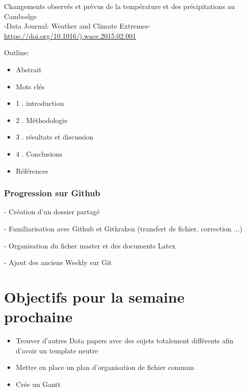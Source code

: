 \documentclass[11pt,oneside]{article}
\begin{document}
\begin{center}
Changements observés et prévus de la température et des précipitations au Cambodge\\
-Data Journal: Weather and Climate Extremes-\\
\url {https://doi.org/10.1016/j.wace.2015.02.001}
\end{center}
\noindent Outline:
\begin{itemize}
\item Abstrait
\item Mots clés
\item 1 . introduction
\item 2 . Méthodologie
\item 3 . résultats et discussion
\item 4 . Conclusions
\item Références
\end{itemize}




\newpage
\onecolumn

\section*{Progression sur Github}
- Création d'un dossier partagé

- Familiarisation avec Github et Gitkraken (transfert de fichier, correction ...)

- Organisation du ficher master et des documents Latex

- Ajout des anciens Weekly sur Git


\newpage
\part*{Objectifs pour la semaine prochaine}
\begin{itemize}
	\item Trouver d'autres Data papers avec des sujets totalement différents afin d'avoir un template neutre
	\item Mettre en place un plan d'organisation de fichier commun
	\item Crée un Gantt
	

\end{itemize}
\end{document}
